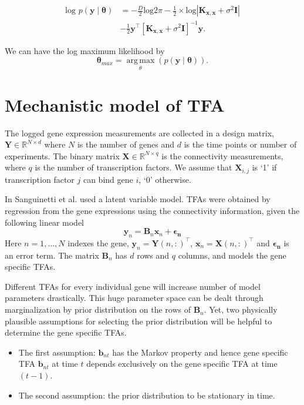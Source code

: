 \begin{equation} \label{eq:Likelihood}
\begin{split}
\text{log } p\left(\mathbf{y}\middle|\boldsymbol{\theta}\right) &=
- \frac{D}{2}\text{log}2\pi - \frac{1}{2}\times \text{log} \left| \mathbf{K_{x,x}} + \sigma^2\mathbf{I}\right|\\
&- \frac{1}{2}\mathbf{y}^\top \left[\mathbf{K_{x,x}} + \sigma^2\mathbf{I} \right]^{-1}\mathbf{y}.
\end{split}
\end{equation}

We can have the log maximum likelihood by
\begin{equation} \label{eq:LML}
\boldsymbol{\theta}_{max} =  \operatorname*{arg\,max}_\theta \left( p\left(\mathbf{y}\middle|\boldsymbol{\theta}\right) \right).
\end{equation}

\section{Mechanistic model of TFA}\label{sec:Probabilistic_TFA}
The logged gene expression measurements are collected in a design matrix, $\textbf{Y} \in \mathbb{R}^{ N \times d}$ where $N$ is the number of genes and $d$ is the time points or number of experiments. The binary matrix $\textbf{X} \in \mathbb{R} ^ {N \times q}$ is the connectivity measurements, where $q$ is the number of transcription factors. We assume that $\textbf{X}_{i,j}$ is \lq 1\rq{ }if transcription factor $j$ can bind gene $i$, \lq 0\rq{ }otherwise.

In \cite{Sanguinetti:2006} Sanguinetti et al. used a latent variable model. TFAs were obtained by regression from the gene expressions using the connectivity information, given the following linear model 
\begin{equation} \label{eq:linear_model_TFA}
\textbf{y}_n = \textbf{B}_n \textbf{x}_n + \boldsymbol{\epsilon_{n}}
\end{equation}
Here $n = 1, . . . ,N$ indexes the gene, $\textbf{y}_n =\textbf{Y}(n,:)^{\top}$, $\textbf{x}_n=\textbf{X}(n,:)^{\top}$ and $\boldsymbol{\epsilon_{n}}$ is an error term. The matrix $\textbf{B}_n$ has $d$ rows and $q$ columns, and models the gene specific TFAs.

Different TFAs for every individual gene will increase number of model parameters drastically. This huge parameter space can be dealt through marginalization by prior distribution on the rows of $\textbf{B}_n$. Yet, 
two physically plausible assumptions for selecting the prior distribution will be helpful to determine the gene specific TFAs. 
\begin{itemize}
	\item The first assumption: $\textbf{b}_{nt}$ has the Markov property and hence gene specific TFA $\textbf{b}_{nt} $ at time $t$ depends exclusively on the gene specific TFA at time $(t-1)$.
	\item The second assumption: the prior distribution to be stationary in time.
\end{itemize}

